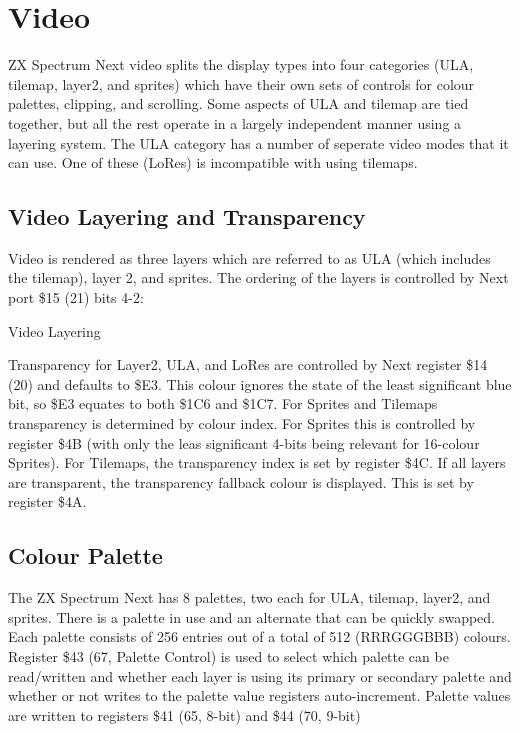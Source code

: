 \section{Video}

ZX Spectrum Next video splits the display types into four categories
(ULA, tilemap, layer2, and sprites) which have their own sets of
controls for colour palettes, clipping, and scrolling. Some aspects of
ULA and tilemap are tied together, but all the rest operate in a
largely independent manner using a layering system. The ULA category
has a number of seperate video modes that it can use. One of these
(LoRes) is incompatible with using tilemaps.

\subsection{Video Layering and Transparency}
Video is rendered as three layers which are referred to as ULA (which
includes the tilemap), layer 2, and sprites.  The ordering of the
layers is controlled by Next port \$15 (21) bits 4-2:

\begin{table}[h]\centering
  \caption{Video Layering}
\end{table}

Transparency for Layer2, ULA, and LoRes are controlled by Next
register \$14 (20) and defaults to \$E3. This colour ignores the state
of the least significant blue bit, so \$E3 equates to both \$1C6 and
\$1C7. For Sprites and Tilemaps transparency is determined by colour
index. For Sprites this is controlled by register \$4B (with only the
leas significant 4-bits being relevant for 16-colour Sprites). For
Tilemaps, the transparency index is set by register \$4C. If all
layers are transparent, the transparency fallback colour is
displayed. This is set by register \$4A.

\subsection{Colour Palette}

The ZX Spectrum Next has 8 palettes, two each for ULA, tilemap,
layer2, and sprites.  There is a palette in use and an alternate that
can be quickly swapped.  Each palette consists of 256 entries out of a
total of 512 (RRRGGGBBB) colours.  Register \$43 (67, Palette Control)
is used to select which palette can be read/written and whether each
layer is using its primary or secondary palette and whether or not
writes to the palette value registers auto-increment. Palette values
are written to registers \$41 (65, 8-bit) and \$44 (70, 9-bit)

